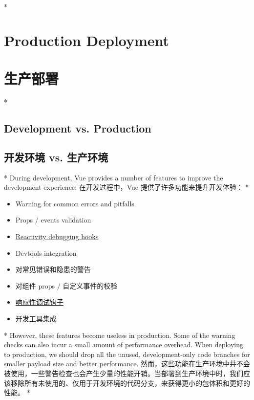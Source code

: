 
\begin{paracol}{2} 

\switchcolumn[0]*%
\section{Production Deployment}
\switchcolumn
\section{生产部署}
\switchcolumn[0]*%
\subsection{Development vs. Production}
\switchcolumn
\subsection{开发环境 vs. 生产环境}
\switchcolumn[0]*%
During development, Vue provides a number of features to improve the
development experience:
\switchcolumn
在开发过程中，Vue 提供了许多功能来提升开发体验：  
\switchcolumn[0]*%
\begin{itemize}
\item
  Warning for common errors and pitfalls
\item
  Props / events validation
\item
  \href{https://vuejs.org/guide/extras/reactivity-in-depth.html\#reactivity-debugging}{Reactivity
  debugging hooks}
\item
  Devtools integration
\end{itemize}
\switchcolumn
\begin{itemize}
\item
  对常见错误和隐患的警告
\item
  对组件 props / 自定义事件的校验
\item
  \href{https://cn.vuejs.org/guide/extras/reactivity-in-depth.html\#reactivity-debugging}{响应性调试钩子}
\item
  开发工具集成
\end{itemize}
\switchcolumn[0]*%
However, these features become useless in production. Some of the
warning checks can also incur a small amount of performance overhead.
When deploying to production, we should drop all the unused,
development-only code branches for smaller payload size and better
performance.
\switchcolumn
然而，这些功能在生产环境中并不会被使用，一些警告检查也会产生少量的性能开销。当部署到生产环境中时，我们应该移除所有未使用的、仅用于开发环境的代码分支，来获得更小的包体积和更好的性能。
\switchcolumn[0]*%

\end{paracol}
